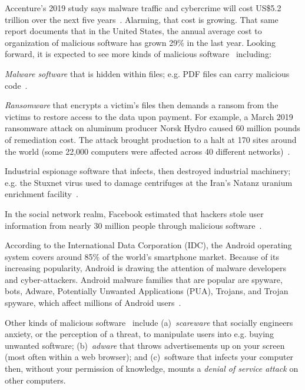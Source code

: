   
Accenture's 2019 study says   malware traffic and cybercrime will cost US\$5.2 trillion over the next five years~\cite{bissell2019cost}.
Alarming, that cost is growing. That same report documents that in the United States,  the annual average cost to organization of malicious software has grown 29\% in the last year. Looking forward, it is expected
to see more kinds of malicious software~\cite{bissell2019cost} including: 
\bi
\item
{\em Malware software} that is hidden within   files; e.g. PDF files can carry malicious code~\cite{smith01}.
\item
{\em Ransomware} that encrypts a victim's files then  demands a ransom from the victims to restore access to the data upon payment.
For example, a March 2019 ransomware attack on aluminum producer Norsk Hydro caused 60 million pounds of remediation cost. The attack  brought production to a halt at 170 sites around the world (some 22,000 computers were affected across 40 different networks)~\cite{bissell2019cost}. 
\item
Industrial espionage software that infects, then destroyed  industrial machinery; e.g. the Stuxnet virus used to damage centrifuges at
the Iran’s Natanz uranium enrichment facility~\cite{langner2011stuxnet}.
\item
In the social network realm, Facebook estimated that hackers stole user information from nearly 30 million people through malicious software~\cite{facebookreport}.
\item
According to the International Data Corporation (IDC), the Android operating system covers around 85\% of the world’s smartphone market. Because of its increasing popularity, Android is drawing the attention of malware developers and cyber-attackers. Android malware families that are popular are spyware, bots, Adware, Potentially Unwanted Applications (PUA), Trojans, and Trojan spyware, which affect millions of Android users~\cite{bhat2019survey}.
\item
Other kinds of malicious software~\cite{monshizadeh2014security} include (a)~{\em scareware} that   socially engineers anxiety, or the perception of a threat, to manipulate users into e.g. buying unwanted software; (b)~{\em adware} that throws advertisements up on your screen (most often within a web browser); and (c)~software that infects your computer then, without your permission of knowledge, mounts a {\em denial of service attack} on other computers. 
\ei


 
